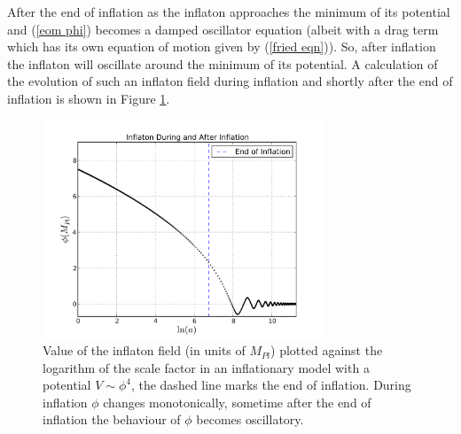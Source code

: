 \documentclass[letterpaper,11pt]{article}
\begin{document}

After the end of inflation as the inflaton approaches the minimum of its potential and (\ref{eom phi}) becomes a damped oscillator equation (albeit with a drag term which has its own equation of motion given by (\ref{fried eqn})). So, after inflation the inflaton will oscillate around the minimum of its potential. A calculation of the evolution of such an inflaton field during inflation and shortly after the end of inflation is shown in Figure \ref{inflation plot}.

\begin{figure}
\begin{center}
\includegraphics[width=0.75\textwidth]{inflaton_plot1.png}
\caption{Value of the inflaton field (in units of $M_{Pl}$) plotted against the logarithm of the scale factor in an inflationary model with a potential $V \sim \phi^4$, the dashed line marks the end of inflation. During inflation $\phi$ changes monotonically, sometime after the end of inflation the behaviour of $\phi$ becomes oscillatory.}
\label{inflation plot}
\end{center}
\end{figure}
\end{document}
